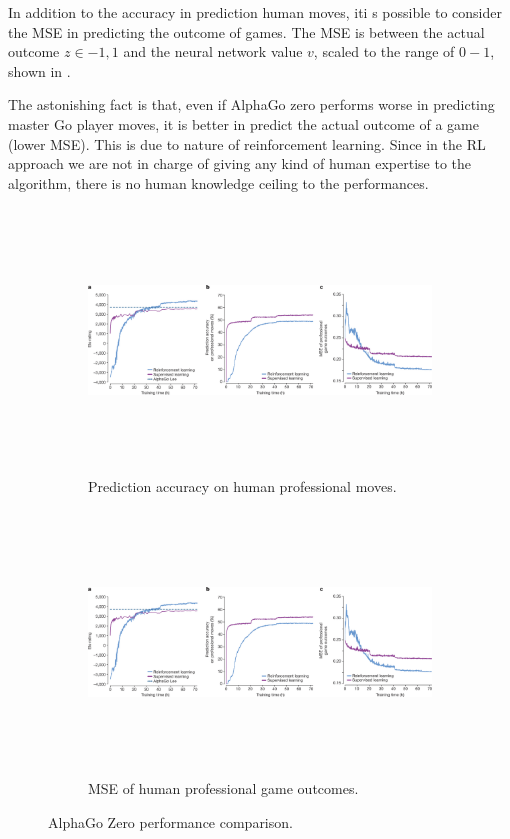 \documentclass{article}
\begin{document}
In addition to the accuracy in prediction human moves, iti s possible to consider the MSE in predicting the outcome of games. The MSE is between the actual outcome $z \in {-1, 1}$ and the neural network value $v$, scaled to the range of $0-1$, shown in .

The astonishing fact is that, even if AlphaGo zero performs worse in predicting master Go player moves, it is better in predict the actual outcome of a game (lower MSE). This is due to nature of reinforcement learning. Since in the RL approach we are not in charge of giving any kind of human expertise to the algorithm, there is no human knowledge ceiling to the performances.

\begin{figure}[H]
	\begin{subfigure}{.5\textwidth}
		\centering
		\includegraphics[height=7cm,trim={717px 0px 710px 45px},clip]{alpha-go-zero_empirical_results.png}
		\caption{Prediction accuracy on human professional moves.}
		\label{fig:training-acc}
	\end{subfigure}
	\hfill
	\begin{subfigure}{.5\textwidth}
		\centering
		\includegraphics[height=7cm,trim={1408px 0px 0px 45px},clip]{alpha-go-zero_empirical_results.png}
		\caption{MSE of human professional game outcomes.}
		\label{fig:training-mse}
	\end{subfigure}
	\caption{AlphaGo Zero performance comparison. \cite{Silver_2016}}
\end{figure}
\end{document}
